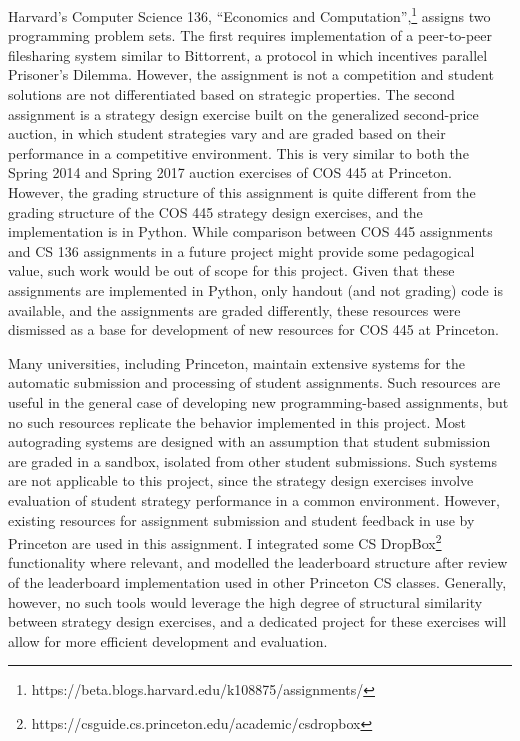\documentclass[pageno]{jpaper}
\begin{document}
Harvard's Computer Science 136, ``Economics and Computation'',\footnote{https://beta.blogs.harvard.edu/k108875/assignments/} assigns two programming problem sets.
The first requires implementation of a peer-to-peer filesharing system similar to Bittorrent, a protocol in which incentives parallel Prisoner's Dilemma.
However, the assignment is not a competition and student solutions are not differentiated based on strategic properties.
The second assignment is a strategy design exercise built on the generalized second-price auction, in which student strategies vary and are graded based on their performance in a competitive environment.
This is very similar to both the Spring 2014 and Spring 2017 auction exercises of COS 445 at Princeton.
However, the grading structure of this assignment is quite different from the grading structure of the COS 445 strategy design exercises, and the implementation is in Python.
While comparison between COS 445 assignments and CS 136 assignments in a future project might provide some pedagogical value, such work would be out of scope for this project.
Given that these assignments are implemented in Python, only handout (and not grading) code is available, and the assignments are graded differently, these resources were dismissed as a base for development of new resources for COS 445 at Princeton.

Many universities, including Princeton, maintain extensive systems for the automatic submission and processing of student assignments.
Such resources are useful in the general case of developing new programming-based assignments, but no such resources replicate the behavior implemented in this project.
Most autograding systems are designed with an assumption that student submission are graded in a sandbox, isolated from other student submissions.
Such systems are not applicable to this project, since the strategy design exercises involve evaluation of student strategy performance in a common environment.
However, existing resources for assignment submission and student feedback in use by Princeton are used in this assignment.
I integrated some CS DropBox\footnote{https://csguide.cs.princeton.edu/academic/csdropbox} functionality where relevant, and modelled the leaderboard structure after review of the leaderboard implementation used in other Princeton CS classes.
Generally, however, no such tools would leverage the high degree of structural similarity between strategy design exercises, and a dedicated project for these exercises will allow for more efficient development and evaluation.
\end{document}
